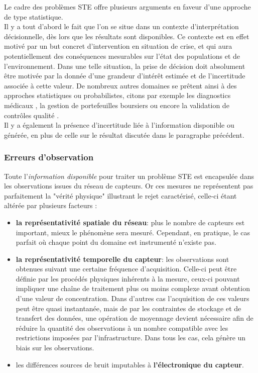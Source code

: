 	Le cadre des problèmes STE offre plusieurs arguments en faveur d'une approche de type statistique.\\
	
	Il y a tout d'abord le fait que l'on se situe dans un contexte d'interprétation décisionnelle, dès lors que les résultats sont disponibles. Ce contexte est en effet motivé par un but concret d'intervention en situation de crise, et qui aura potentiellement des conséquences mesurables sur l'état des populations et de l'environnement. Dans une telle situation, la prise de décision doit absolument être motivée par la donnée d'une grandeur d'intérêt estimée et de l'incertitude associée à cette valeur. De nombreux autres domaines se prêtent ainsi à des approches statistiques ou probabilistes, citons par exemple les diagnostics médicaux \cite{Kononenko2001}, la gestion de portefeuilles boursiers \cite{Bouchaud2003} ou encore la validation de contrôles qualité \cite{Alt2001}.\\
	
	Il y a également la présence d'incertitude liée à l'information disponible ou générée, en plus de celle sur le résultat discutée dans le paragraphe précédent. \\
	
	\subsubsection{Erreurs d'observation}
	Toute l'\textit{information disponible} pour traiter un problème STE est encapsulée dans les observations issues du réseau de capteurs. Or ces mesures ne représentent pas parfaitement la "vérité physique" illustrant le rejet caractérisé, celle-ci étant altérée par plusieurs facteurs : \\
	
	\begin{itemize}
		\item \textbf{la représentativité spatiale du réseau}: plus le nombre de capteurs est important, mieux le phénomène sera mesuré. Cependant, en pratique, le cas parfait où chaque point du domaine est instrumenté n'existe pas.
		\item \textbf{la représentativité temporelle du capteur}: les observations sont obtenues suivant une certaine fréquence d'acquisition. Celle-ci peut être définie par les procédés physiques inhérents à la mesure, ceux-ci pouvant impliquer une chaîne de traitement plus ou moins complexe avant obtention d'une valeur de concentration. Dans d'autres cas l'acquisition de ces valeurs peut être quasi instantanée, mais de par les contraintes de stockage et de transfert des données, une opération de moyennage devient nécessaire afin de réduire la quantité des observations à un nombre compatible avec les restrictions imposées par l'infrastructure. Dans tous les cas, cela génère un biais sur les observations.
		\item les différences sources de bruit imputables à \textbf{l'électronique du capteur}.\\
	\end{itemize}
	
